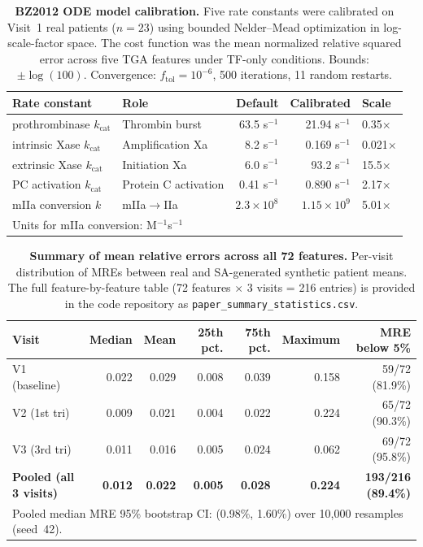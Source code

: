 \begin{table}[ht]
\centering
\caption{\textbf{BZ2012 ODE model calibration.} Five rate constants were
calibrated on Visit~1 real patients ($n{=}23$) using bounded Nelder--Mead
optimization in log-scale-factor space. The cost function was the mean
normalized relative squared error across five TGA features under TF-only
conditions. Bounds: $\pm\log(100)$. Convergence: $f_{\text{tol}} = 10^{-6}$,
500 iterations, 11 random restarts.}
\label{stab:ode-calibration}
\begin{tabular}{llrrl}
\toprule
Rate constant & Role & Default & Calibrated & Scale \\
\midrule
prothrombinase $k_{\text{cat}}$ & Thrombin burst & 63.5 s$^{-1}$ & 21.94 s$^{-1}$ & 0.35$\times$ \\
intrinsic Xase $k_{\text{cat}}$ & Amplification Xa & 8.2 s$^{-1}$ & 0.169 s$^{-1}$ & 0.021$\times$ \\
extrinsic Xase $k_{\text{cat}}$ & Initiation Xa & 6.0 s$^{-1}$ & 93.2 s$^{-1}$ & 15.5$\times$ \\
PC activation $k_{\text{cat}}$ & Protein C activation & 0.41 s$^{-1}$ & 0.890 s$^{-1}$ & 2.17$\times$ \\
mIIa conversion $k$ & mIIa$\to$IIa & $2.3{\times}10^8$ & $1.15{\times}10^9$ & 5.01$\times$ \\
\bottomrule
\multicolumn{5}{l}{\small Units for mIIa conversion: M$^{-1}$s$^{-1}$} \\
\end{tabular}
\end{table}

\begin{table}[ht]
\centering
\caption{\textbf{Summary of mean relative errors across all 72 features.}
Per-visit distribution of MREs between real and SA-generated synthetic patient
means. The full feature-by-feature table (72 features $\times$ 3 visits = 216
entries) is provided in the code repository as
\texttt{paper\_summary\_statistics.csv}.}
\label{stab:mre-summary}
{\small
\setlength{\tabcolsep}{4pt}
\begin{tabular}{lrrrrrr}
\toprule
Visit & Median & Mean & 25th pct. & 75th pct. & Maximum & MRE below 5\% \\
\midrule
V1 (baseline)   & 0.022 & 0.029 & 0.008 & 0.039 & 0.158 & 59/72 (81.9\%) \\
V2 (1st tri)    & 0.009 & 0.021 & 0.004 & 0.022 & 0.224 & 65/72 (90.3\%) \\
V3 (3rd tri)    & 0.011 & 0.016 & 0.005 & 0.024 & 0.062 & 69/72 (95.8\%) \\
\midrule
\textbf{Pooled (all 3 visits)} & \textbf{0.012} & \textbf{0.022} & \textbf{0.005} & \textbf{0.028} & \textbf{0.224} & \textbf{193/216 (89.4\%)} \\
\bottomrule
\multicolumn{7}{p{0.95\textwidth}}{\small Pooled median MRE 95\% bootstrap CI: (0.98\%, 1.60\%) over 10{,}000 resamples (seed~42).}
\end{tabular}
}
\end{table}

